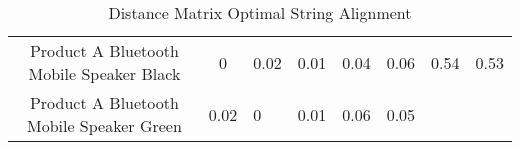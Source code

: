 \documentclass[]{article}
\begin{document}
\begin{longtable}[]{@{}ccllllll@{}}
\caption{Distance Matrix Optimal String Alignment}\tabularnewline
\toprule
\begin{minipage}[t]{0.36\columnwidth}\centering\strut
Product A Bluetooth Mobile Speaker Black\strut
\end{minipage} & \begin{minipage}[t]{0.05\columnwidth}\centering\strut
0\strut
\end{minipage} & \begin{minipage}[t]{0.05\columnwidth}\raggedright\strut
0.02\strut
\end{minipage} & \begin{minipage}[t]{0.05\columnwidth}\raggedright\strut
0.01\strut
\end{minipage} & \begin{minipage}[t]{0.05\columnwidth}\raggedright\strut
0.04\strut
\end{minipage} & \begin{minipage}[t]{0.05\columnwidth}\raggedright\strut
0.06\strut
\end{minipage} & \begin{minipage}[t]{0.05\columnwidth}\raggedright\strut
0.54\strut
\end{minipage} & \begin{minipage}[t]{0.05\columnwidth}\raggedright\strut
0.53\strut
\end{minipage}\tabularnewline
\begin{minipage}[t]{0.36\columnwidth}\centering\strut
Product A Bluetooth Mobile Speaker Green\strut
\end{minipage} & \begin{minipage}[t]{0.05\columnwidth}\centering\strut
0.02\strut
\end{minipage} & \begin{minipage}[t]{0.05\columnwidth}\raggedright\strut
0\strut
\end{minipage} & \begin{minipage}[t]{0.05\columnwidth}\raggedright\strut
0.01\strut
\end{minipage} & \begin{minipage}[t]{0.05\columnwidth}\raggedright\strut
0.06\strut
\end{minipage} & \begin{minipage}[t]{0.05\columnwidth}\raggedright\strut
0.05\strut
\end{minipage} & \begin{minipage}[t]{0.05\columnwidth}\raggedright\strut

\end{minipage}
\end{longtable}
\end{document}

